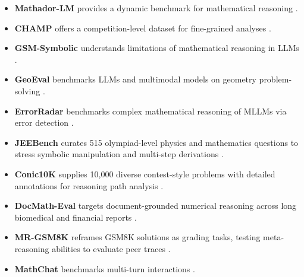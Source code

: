 \documentclass[acmsmall,anonymous]{acmart}
\begin{document}
\begin{itemize}
    \item \textbf{Mathador-LM} provides a dynamic benchmark for mathematical reasoning \cite{kurtic2024}.
    \item \textbf{CHAMP} offers a competition-level dataset for fine-grained analyses \cite{mao2024}.
    \item \textbf{GSM-Symbolic} understands limitations of mathematical reasoning in LLMs \cite{mirzadeh2024}.
    \item \textbf{GeoEval} benchmarks LLMs and multimodal models on geometry problem-solving \cite{zhang2024d}.
    \item \textbf{ErrorRadar} benchmarks complex mathematical reasoning of MLLMs via error detection \cite{yan2024a}.
    \item \textbf{JEEBench} curates 515 olympiad-level physics and mathematics questions to stress symbolic manipulation and multi-step derivations \cite{arora-2023-jeebench}.
    \item \textbf{Conic10K} supplies 10{,}000 diverse contest-style problems with detailed annotations for reasoning path analysis \cite{wu-2023-conic10k}.
    \item \textbf{DocMath-Eval} targets document-grounded numerical reasoning across long biomedical and financial reports \cite{zhao-2024-docmatheval}.
    \item \textbf{MR-GSM8K} reframes GSM8K solutions as grading tasks, testing meta-reasoning abilities to evaluate peer traces \cite{zeng-2024-mr-gsm8k}.
    \item \textbf{MathChat} benchmarks multi-turn interactions \cite{liang2024c}.
\end{itemize}
\end{document}
